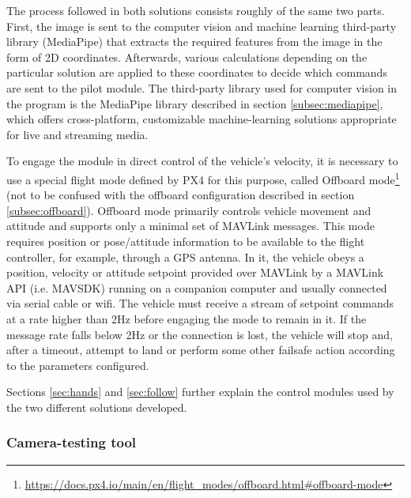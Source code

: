 The process followed in both solutions consists roughly of the same two parts.
First, the image is sent to the computer vision and machine learning third-party library (MediaPipe) that extracts the required features from the image in the form of 2D coordinates.
Afterwards, various calculations depending on the particular solution are applied to these coordinates to decide which commands are sent to the pilot module.
The third-party library used for computer vision in the program is the MediaPipe library described in section \ref{subsec:mediapipe}, which offers cross-platform, customizable machine-learning solutions appropriate for live and streaming media.

To engage the module in direct control of the vehicle's velocity, it is necessary to use a special flight mode defined by PX4 for this purpose, called Offboard mode\footnote{\url{https://docs.px4.io/main/en/flight_modes/offboard.html\#offboard-mode}} (not to be confused with the offboard configuration described in section \ref{subsec:offboard}).
Offboard mode primarily controls vehicle movement and attitude and supports only a minimal set of MAVLink messages.
This mode requires position or pose/attitude information to be available to the flight controller, for example, through a GPS antenna.
In it, the vehicle obeys a position, velocity or attitude setpoint provided over MAVLink by a MAVLink API (i.e. MAVSDK) running on a companion computer and usually connected via serial cable or wifi.
The vehicle must receive a stream of setpoint commands at a rate higher than 2Hz before engaging the mode to remain in it.
If the message rate falls below 2Hz or the connection is lost, the vehicle will stop and, after a timeout, attempt to land or perform some other failsafe action according to the parameters configured.

Sections \ref{sec:hands} and \ref{sec:follow} further explain the control modules used by the two different solutions developed.

\subsubsection{Camera-testing tool}
\label{subsec:cam-tool}

